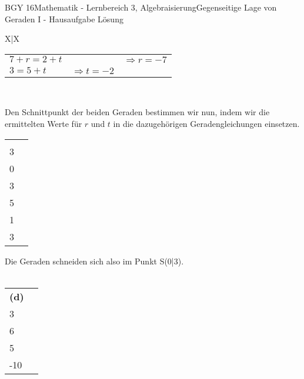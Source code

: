 \documentclass[oneside,openany,headings=optiontotoc,11pt,numbers=noenddot]{scrreprt}
\begin{document}
\begin{worksheet}{BGY 16}{Mathematik - Lernbereich 3, Algebraisierung}{Gegenseitige Lage von Geraden I - Hausaufgabe Lösung}
\begin{framed}
\begin{tabularx}{\textwidth}{X|X}
\begin{tabular}{lll}
					\( 7 + r = 2 + t\)& & \(\Rightarrow r = -7\)\\
					\(3 = 5 + t\) & \(\Rightarrow t = -2\)
				\end{tabular}
			\end{tabularx}\\
			\par\noindent
			Den Schnittpunkt der beiden Geraden bestimmen wir nun, indem wir die ermittelten Werte für \(r\) und \(t\) in die dazugehörigen Geradengleichungen einsetzen.\\
			\par\noindent
			\begin{tabularx}{\textwidth}{XX}
				\(\left(\begin{array}{c}7\\3\end{array}\right) - 7\left(\begin{array}{c}1\\0\end{array}\right) = \left(\begin{array}{c}0\\3\end{array}\right)\) & \(\left(\begin{array}{c}2\\5\end{array}\right) - 2\left(\begin{array}{c}1\\1\end{array}\right) = \left(\begin{array}{c}0\\3\end{array}\right)\)
			\end{tabularx}
			\par\noindent			
			Die Geraden schneiden sich also im Punkt S(0|3).\\
			\noindent
			\hdashrule[0.5ex][x]{\textwidth}{0.1mm}{8mm 2pt}\\
			\par\noindent
			\begin{tabularx}{\textwidth}{XX}
				\textbf{(d)} \(g: \vec{x} = \left(\begin{array}{c}1\\3\end{array}\right) + r\left(\begin{array}{c}3\\6\end{array}\right)\) & \(h: \vec{x} = \left(\begin{array}{c}2\\5\end{array}\right) + t\left(\begin{array}{c}-5\\-10\end{array}\right)\)

\end{tabularx}
\end{framed}
\end{worksheet}
\end{document}
